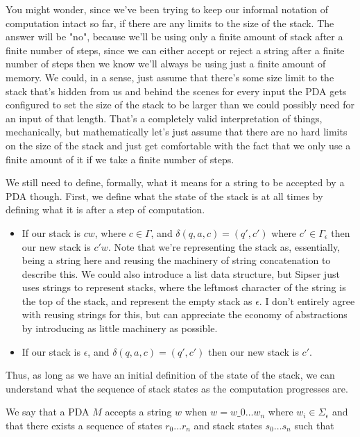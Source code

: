 \documentclass[11pt]{article}
\begin{document}
You might wonder, since we've been trying to keep our informal notation of computation intact so far, if there are any limits to the size of the stack. The answer will be "no", because we'll be using only a finite amount of stack after a finite number of steps, since we can either accept or reject a string after a finite number of steps then we know we'll always be using just a finite amount of memory. We could, in a sense, just assume that there's some size limit to the stack that's hidden from us and behind the scenes for every input the PDA gets configured to set the size of the stack to be larger than we could possibly need for an input of that length. That's a completely valid interpretation of things, mechanically, but mathematically let's just assume that there are no hard limits on the size of the stack and just get comfortable with the fact that we only use a finite amount of it if we take a finite number of steps.

We still need to define, formally, what it means for a string to be accepted by a PDA though. First, we define what the state of the stack is at all times by defining what it is after a step of computation.

\begin{itemize}
\item If our stack is $c w$, where $c \in \Gamma$, and $\delta(q,a,c) = (q',c')$ where $c' \in \Gamma_{\epsilon}$ then our new stack is $c' w$. Note that we're representing the stack as, essentially, being a string here and reusing the machinery of string concatenation to describe this. We could also introduce a list data structure, but Sipser just uses strings to represent stacks, where the leftmost character of the string is the top of the stack, and represent the empty stack as $\epsilon$. I don't entirely agree with reusing strings for this, but can appreciate the economy of abstractions by introducing as little machinery as possible.

\item If our stack is $\epsilon$, and $\delta(q,a,c) = (q',c')$ then our new stack is $c'$.
\end{itemize}

Thus, as long as we have an initial definition of the state of the stack, we can understand what the sequence of stack states as the computation progresses are.

We say that a PDA $M$ accepts a string $w$ when $w = w\_0 \ldots w_n$ where $w_i \in \Sigma_{\epsilon}$ and that there exists a sequence of states $r_0 \ldots r_n$ and stack states $s_0 \ldots s_n$ such that
\end{document}
